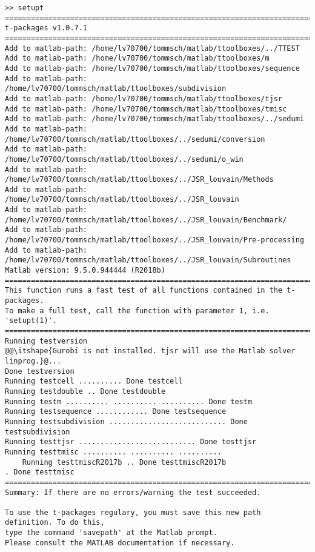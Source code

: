 {\small
\begin{lstlisting}[style=base]
>> setupt
=====================================================================================
t-packages v1.0.7.1
=====================================================================================
Add to matlab-path: /home/lv70700/tommsch/matlab/ttoolboxes/../TTEST
Add to matlab-path: /home/lv70700/tommsch/matlab/ttoolboxes/m
Add to matlab-path: /home/lv70700/tommsch/matlab/ttoolboxes/sequence
Add to matlab-path: /home/lv70700/tommsch/matlab/ttoolboxes/subdivision
Add to matlab-path: /home/lv70700/tommsch/matlab/ttoolboxes/tjsr
Add to matlab-path: /home/lv70700/tommsch/matlab/ttoolboxes/tmisc
Add to matlab-path: /home/lv70700/tommsch/matlab/ttoolboxes/../sedumi
Add to matlab-path: /home/lv70700/tommsch/matlab/ttoolboxes/../sedumi/conversion
Add to matlab-path: /home/lv70700/tommsch/matlab/ttoolboxes/../sedumi/o_win
Add to matlab-path: /home/lv70700/tommsch/matlab/ttoolboxes/../JSR_louvain/Methods
Add to matlab-path: /home/lv70700/tommsch/matlab/ttoolboxes/../JSR_louvain
Add to matlab-path: /home/lv70700/tommsch/matlab/ttoolboxes/../JSR_louvain/Benchmark/
Add to matlab-path: /home/lv70700/tommsch/matlab/ttoolboxes/../JSR_louvain/Pre-processing
Add to matlab-path: /home/lv70700/tommsch/matlab/ttoolboxes/../JSR_louvain/Subroutines
Matlab version: 9.5.0.944444 (R2018b)
=====================================================================================
This function runs a fast test of all functions contained in the t-packages.
To make a full test, call the function with parameter 1, i.e. 'setupt(1)'.
=====================================================================================
Running testversion
@@\itshape{Gurobi is not installed. tjsr will use the Matlab solver linprog.}@...
Done testversion
Running testcell .......... Done testcell
Running testdouble .. Done testdouble
Running testm .......... .......... .......... Done testm
Running testsequence ............ Done testsequence
Running testsubdivision ........................... Done testsubdivision
Running testtjsr ........................... Done testtjsr
Running testtmisc .......... .......... .......... 
    Running testtmiscR2017b .. Done testtmiscR2017b
. Done testtmisc
=====================================================================================
Summary: If there are no errors/warning the test succeeded.

To use the t-packages regulary, you must save this new path definition. To do this, 
type the command 'savepath' at the Matlab prompt. 
Please consult the MATLAB documentation if necessary.
\end{lstlisting}
}


